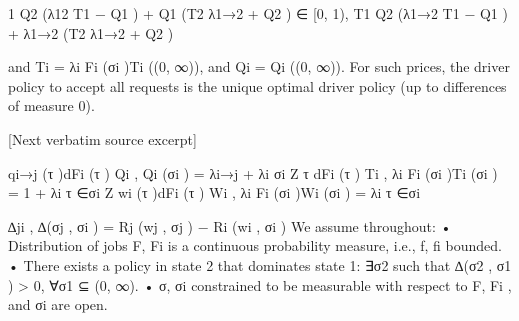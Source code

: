 \documentclass[10pt]{article}
\begin{document}
\begin{ReviewVerbatim}
1 Q2 (λ12 T1 − Q1 ) + Q1 (T2 λ1→2 + Q2 )
∈ [0, 1),
T1 Q2 (λ1→2 T1 − Q1 ) + λ1→2 (T2 λ1→2 + Q2 )

and Ti = λi Fi (σi )Ti ((0, ∞)), and Qi = Qi ((0, ∞)). For such prices, the driver policy to accept all
requests is the unique optimal driver policy (up to differences of measure 0).

[Next verbatim source excerpt]

qi→j (τ )dFi (τ )
Qi , Qi (σi ) = λi→j + λi
σi
Z
τ dFi (τ )
Ti , λi Fi (σi )Ti (σi ) = 1 + λi
τ ∈σi
Z
wi (τ )dFi (τ )
Wi , λi Fi (σi )Wi (σi ) = λi
τ ∈σi

∆ji , ∆(σj , σi ) = Rj (wj , σj ) − Ri (wi , σi )
We assume throughout:
• Distribution of jobs F, Fi is a continuous probability measure, i.e., f, fi bounded.
• There exists a policy in state 2 that dominates state 1: ∃σ2 such that ∆(σ2 , σ1 ) > 0, ∀σ1 ⊆
(0, ∞).
• σ, σi constrained to be measurable with respect to F, Fi , and σi are open.
\end{ReviewVerbatim}
\end{document}
